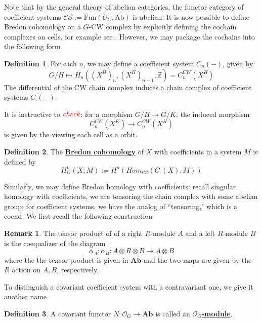 \documentclass{article}
\theoremstyle{definition}
\theoremstyle{definition}
\newtheorem{definition}{Definition}[theorem]
\theoremstyle{definition}
\newtheorem{remark}{Remark}[theorem]
\theoremstyle{definition}
\theoremstyle{definition}
\theoremstyle{definition}
\theoremstyle{definition}
\begin{document}
Note that by the general theory of abelian categories, the functor category of coefficient systems $\mathcal{CS}:=\textrm{Fun}(\mathcal{O}_G, \textrm{Ab})$ is abelian. It is now possible to define Bredon cohomology on a $G$-CW complex by explicitly defining the cochain complexes on cells, for example see . However, we may package the cochains into the following form 

\begin{tcolorbox}[colback=purple!5!white,colframe=purple!75!black]
\begin{definition}
For each $n$, we may define a coefficient system $C_n(-)$, given by 
\[G/H\mapsto H_n((X^H)_{n},(X^H)_{n-1}; \mathbb{Z})=C_n^{CW}(X^H)\]
The differential of the CW chain complex induces a chain complex of coefficient systems $C_{\cdot}(-)$. 
\end{definition}
\end{tcolorbox}
It is instructive to $\textcolor{red}{check}$: for a morphism $G/H\to G/K$, the induced morphism 
\[C_n^{CW}(X^K)\to C_n^{CW}(X^H)\]
is given by the viewing each cell as a orbit.

\begin{tcolorbox}[colback=purple!5!white,colframe=purple!75!black]
\begin{definition}
The \underline{\textbf{Bredon cohomology}} of $X$ with coefficients in a system $M$ is defined by 
\[H_G^n(X;M):=H^n(Hom_{\mathcal{CS}}(C_{\cdot}(X),M))\]
\end{definition}
\end{tcolorbox}

Similarly, we may define Bredon homology with coefficients: recall singular homology with coefficients, we are tensoring the chain complex with some abelian group; for coefficient systems, we have the analog of ``tensoring," which is a coend. We first recall the following construction


\begin{tcolorbox}[colback=green!5!white,colframe=green!30!white]
\begin{remark}
The tensor product of of a right $R$-module $A$ and a left $R$-module $B$ is the coequalizer of the diagram 
\[\alpha_A:\alpha_B: A\otimes R\otimes B\to A\otimes B\]
where the the tensor product is given in $\textbf{Ab}$ and the two maps are given by the $R$ action on $A,B$, respectively.
\end{remark}
\end{tcolorbox}

To distinguish a covariant coefficient system with a contravariant one, we give it another name
\begin{tcolorbox}[colback=purple!5!white,colframe=purple!75!black]
\begin{definition}
A covariant functor $N: \mathcal{O}_G\to \textbf{Ab}$ is called an \underline{$\mathcal{O}_G$\textbf{-module}}.
\end{definition}
\end{tcolorbox}
\end{document}
